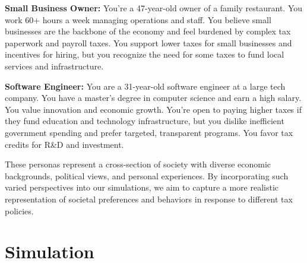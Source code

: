 \begin{tcolorbox}
    \textbf{Small Business Owner:} You're a 47-year-old owner of a family restaurant. You work 60+ hours a week managing operations and staff. You believe small businesses are the backbone of the economy and feel burdened by complex tax paperwork and payroll taxes. You support lower taxes for small businesses and incentives for hiring, but you recognize the need for some taxes to fund local services and infrastructure.
\end{tcolorbox}

\begin{tcolorbox}
    \textbf{Software Engineer:} You are a 31-year-old software engineer at a large tech company. You have a master's degree in computer science and earn a high salary. You value innovation and economic growth. You're open to paying higher taxes if they fund education and technology infrastructure, but you dislike inefficient government spending and prefer targeted, transparent programs. You favor tax credits for R\&D and investment.
\end{tcolorbox}

These personas represent a cross-section of society with diverse economic backgrounds, political views, and personal experiences. By incorporating such varied perspectives into our simulations, we aim to capture a more realistic representation of societal preferences and behaviors in response to different tax policies.

\section{Simulation}
\label{app:simulation}

